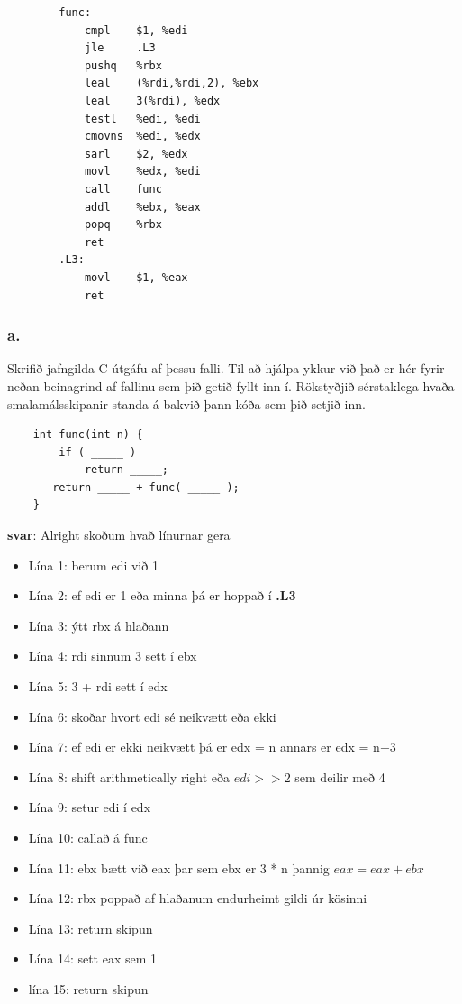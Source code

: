 \documentclass{article}
\begin{document}
\begin{center}
    \begin{verbatim}
        func:
            cmpl    $1, %edi
            jle     .L3
            pushq   %rbx
            leal    (%rdi,%rdi,2), %ebx
            leal    3(%rdi), %edx
            testl   %edi, %edi
            cmovns  %edi, %edx
            sarl    $2, %edx
            movl    %edx, %edi
            call    func   
            addl    %ebx, %eax
            popq    %rbx
            ret 
        .L3:
            movl    $1, %eax
            ret
    \end{verbatim}
\end{center}

\subsubsection{a.}Skrifið jafngilda C útgáfu af þessu falli. Til að hjálpa ykkur við það er hér fyrir
neðan beinagrind af fallinu sem þið getið fyllt inn í. Rökstyðjið sérstaklega
hvaða smalamálsskipanir standa á bakvið þann kóða sem þið setjið inn.

\begin{verbatim}
    int func(int n) {
        if ( _____ )
            return _____;
       return _____ + func( _____ );
    }
\end{verbatim}

\textbf{svar}: 
Alright skoðum hvað línurnar gera
\begin{itemize}
    \item Lína 1: berum edi við 1
    \item Lína 2: ef edi er 1 eða minna þá er hoppað í \textbf{.L3}
    \item Lína 3: ýtt rbx á hlaðann
    \item Lína 4: rdi sinnum 3 sett í ebx
    \item Lína 5: 3 + rdi sett í edx
    \item Lína 6: skoðar hvort edi sé neikvætt eða ekki
    \item Lína 7: ef edi er ekki neikvætt þá er edx = n annars er edx = n+3
    \item Lína 8: shift arithmetically right eða $ edi >> 2 $ sem deilir með 4
    \item Lína 9: setur edi í edx
    \item Lína 10: callað á func
    \item Lína 11: ebx bætt við eax þar sem ebx er 3 * n þannig $eax = eax + ebx$
    \item Lína 12: rbx poppað af hlaðanum endurheimt gildi úr kösinni
    \item Lína 13: return skipun
    \item Lína 14: sett eax sem 1
    \item lína 15: return skipun
\end{itemize}
\end{document}
